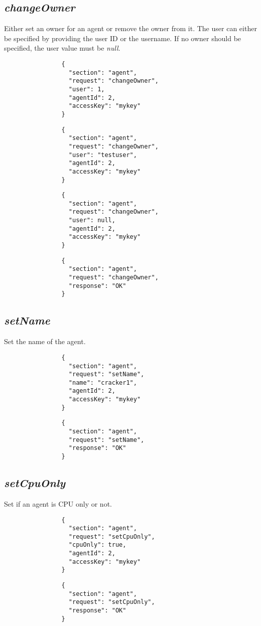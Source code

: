 \documentclass{article}
\begin{document}
		\subsection*{\textit{changeOwner}}
			Either set an owner for an agent or remove the owner from it. The user can either be specified by providing the user ID or the username. If no owner should be specified, the user value must be \textit{null}.
			{
				\color{blue}
				\begin{verbatim}
				{
				  "section": "agent",
				  "request": "changeOwner",
				  "user": 1,
				  "agentId": 2,
				  "accessKey": "mykey"
				}
				\end{verbatim}
			}
			{
				\color{blue}
				\begin{verbatim}
				{
				  "section": "agent",
				  "request": "changeOwner",
				  "user": "testuser",
				  "agentId": 2,
				  "accessKey": "mykey"
				}
				\end{verbatim}
			}
			{
				\color{blue}
				\begin{verbatim}
				{
				  "section": "agent",
				  "request": "changeOwner",
				  "user": null,
				  "agentId": 2,
				  "accessKey": "mykey"
				}
				\end{verbatim}
			}
			{
				\color{OliveGreen}
				\begin{verbatim}
				{
				  "section": "agent",
				  "request": "changeOwner",
				  "response": "OK"
				}
				\end{verbatim}
			}
		\subsection*{\textit{setName}}
			Set the name of the agent.
			{
				\color{blue}
				\begin{verbatim}
				{
				  "section": "agent",
				  "request": "setName",
				  "name": "cracker1",
				  "agentId": 2,
				  "accessKey": "mykey"
				}
				\end{verbatim}
			}
			{
				\color{OliveGreen}
				\begin{verbatim}
				{
				  "section": "agent",
				  "request": "setName",
				  "response": "OK"
				}
				\end{verbatim}
			}
		\subsection*{\textit{setCpuOnly}}
			Set if an agent is CPU only or not.
			{
				\color{blue}
				\begin{verbatim}
				{
				  "section": "agent",
				  "request": "setCpuOnly",
				  "cpuOnly": true,
				  "agentId": 2,
				  "accessKey": "mykey"
				}
				\end{verbatim}
			}
			{
				\color{OliveGreen}
				\begin{verbatim}
				{
				  "section": "agent",
				  "request": "setCpuOnly",
				  "response": "OK"
				}
				\end{verbatim}
			}
\end{document}
